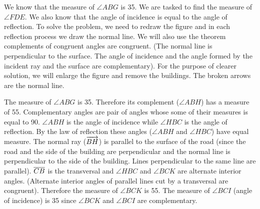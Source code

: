 \begin{enumerate}
We know that the measure of $\angle ABG$ is 35. We are tasked to find the measure of $\angle FDE$. We
also know that the angle of incidence is equal to the angle of reflection. To solve the problem, we
need to redraw the figure and in each reflection process we draw the normal line. We will also use
the theorem complements of congruent angles are congruent. (The normal line is perpendicular to
the surface. The angle of incidence and the angle formed by the incident ray and the surface are
complementary). For the purpose of clearer solution, we will enlarge the figure and remove the
buildings. The broken arrows are the normal line.
\begin{center}
\end{center}
The measure of $\angle ABG$ is 35. Therefore its complement ($\angle ABH$) has a measure of 55.
Complementary angles are pair of angles whose some of their measures is equal to 90. $\angle ABH$ is the angle of
incidence while $\angle HBC$ is the angle of reflection. By the
law of reflection these angles ($\angle ABH$ and $\angle HBC$) have equal measure. The normal ray ($\overrightarrow{BH}$) is parallel to the surface of the road (since the road and the side of the
building are perpendicular and the normal line is
perpendicular to the side of the building. Lines
perpendicular to the same line are parallel). $\overline{CB}$ is the transversal and $\angle HBC$ and $\angle BCK$ are alternate interior angles. (Alternate interior angles of parallel lines cut by
a transversal are congruent). Therefore the measure of
$\angle BCK$ is 55. The measure of $\angle BCI$ (angle of incidence)
is 35 since $\angle BCK$ and $\angle BCI$ are complementary.


\end{enumerate}
